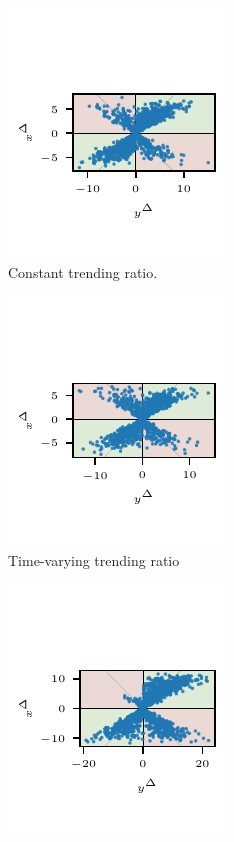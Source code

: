 \begin{figure}
    \centering
    \begin{subfigure}{0.24\textwidth}
        \includegraphics{plots/illustrative_examples/appendix_4q_dgp1}
        \caption{Constant trending ratio.}
    \end{subfigure}\hspace{0.01\textwidth}
    \begin{subfigure}{0.24\textwidth}
        \includegraphics{plots/illustrative_examples/appendix_4q_dgp1_time}
        \caption{Time-varying trending ratio}
    \end{subfigure}\hspace{0.01\textwidth}
    \begin{subfigure}{0.24\textwidth}
        \includegraphics{plots/illustrative_examples/appendix_4q_dgp1_asym}

\end{subfigure}
\end{figure}
